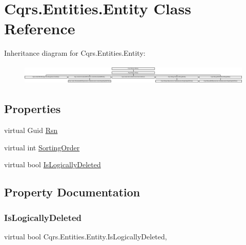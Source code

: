 \hypertarget{classCqrs_1_1Entities_1_1Entity}{}\section{Cqrs.\+Entities.\+Entity Class Reference}
\label{classCqrs_1_1Entities_1_1Entity}
Inheritance diagram for Cqrs.\+Entities.\+Entity\+:\begin{figure}[H]
\begin{center}
\leavevmode
\includegraphics[height=0.961373cm]{classCqrs_1_1Entities_1_1Entity}
\end{center}
\end{figure}
\subsection*{Properties}
\begin{DoxyCompactItemize}
\item 
virtual Guid \hyperlink{classCqrs_1_1Entities_1_1Entity_a5c7605c4ab598f2975b914db7a274796}{Rsn}
\item 
virtual int \hyperlink{classCqrs_1_1Entities_1_1Entity_a9913174d2d333a505af68a0f7e5fd2ca}{Sorting\+Order}
\item 
virtual bool \hyperlink{classCqrs_1_1Entities_1_1Entity_a0d7379f43369a62bfe5783005d3e6ceb}{Is\+Logically\+Deleted}
\end{DoxyCompactItemize}


\subsection{Property Documentation}
\mbox{\label{classCqrs_1_1Entities_1_1Entity_a0d7379f43369a62bfe5783005d3e6ceb}} 
\subsubsection{\texorpdfstring{Is\+Logically\+Deleted}{IsLogicallyDeleted}}
{\footnotesize\ttfamily virtual bool Cqrs.\+Entities.\+Entity.\+Is\+Logically\+Deleted\hspace{0.3cm}{\ttfamily [get]}, {\ttfamily [set]}}

